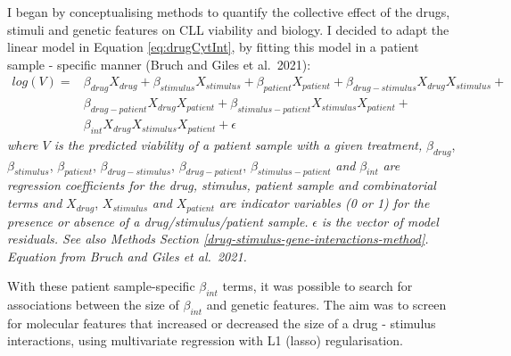 \documentclass[11pt, a4paper, twosided]{book}
\begin{document}
I began by conceptualising methods to quantify the collective effect of the drugs, stimuli and genetic features on CLL viability and biology. I decided to adapt the linear model in Equation \eqref{eq:drugCytInt}, by fitting this model in a patient sample - specific manner (Bruch and Giles et al.~2021):
\begin{equation}
\begin{aligned}
log(V) ={} & \beta_{drug}X_{drug} + \beta_{stimulus}X_{stimulus} + \beta_{patient}X_{patient} + \beta_{drug-stimulus}X_{drug}X_{stimulus} + \\
           &  \beta_{drug-patient}X_{drug}X_{patient} + \beta_{stimulus-patient}X_{stimulus}X_{patient} + \\
           & \beta_{int}X_{drug}X_{stimulus}X_{patient} + \epsilon
           \label{eq:drugCytGeneInt}
\end{aligned}
\end{equation}
\emph{where \(V\) is the predicted viability of a patient sample with a given treatment,} \(\beta_{drug}\), \(\beta_{stimulus}\), \(\beta_{patient}\), \(\beta_{drug-stimulus}\), \(\beta_{drug-patient}\), \(\beta_{stimulus-patient}\) \emph{and} \(\beta_{int}\) \emph{are regression coefficients for the drug, stimulus, patient sample and combinatorial terms and} \(X_{drug}\), \(X_{stimulus}\) \emph{and} \(X_{patient}\) \emph{are indicator variables (0 or 1) for the presence or absence of a drug/stimulus/patient sample.} \(\epsilon\) \emph{is the vector of model residuals. See also Methods Section \ref{drug-stimulus-gene-interactions-method}. Equation from Bruch and Giles et al.~2021.}

With these patient sample-specific \(\beta_{int}\) terms, it was possible to search for associations between the size of \(\beta_{int}\) and genetic features. The aim was to screen for molecular features that increased or decreased the size of a drug - stimulus interactions, using multivariate regression with L1 (lasso) regularisation.
\end{document}
